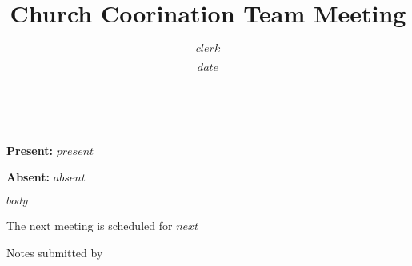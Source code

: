 \documentclass[english,12pt]{article}
\title{Church Coorination Team Meeting}
\date{$date$}
\author{$clerk$}
\renewcommand{\maketitle}{
	\begin{center}
	{\Large\bfseries\thetitle} \vspace{1em} \\
	{\textsl{\thedate}}
	\end{center}
}
\newcommand{\present}{\textbf{Present:} \textsc{$present$} \vspace{1em}}
\newcommand{\absent}{\textbf{Absent:} \textsc{$absent$}}
\begin{document}
\maketitle

\present

\absent

$body$

\vspace{1in}

The next meeting is scheduled for \textsl{$next$}

\vspace{.25in}

Notes submitted by \textsc{\theauthor}
\end{document}

